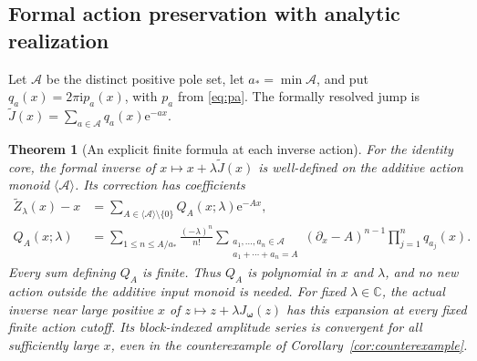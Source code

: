 \documentclass[11pt,a4paper]{article}
\numberwithin{equation}{section}
\newtheorem{theorem}{Theorem}[section]
\theoremstyle{definition}
\theoremstyle{remark}
\newcommand{\ii}{\mathrm i}
\newcommand{\e}{\mathrm e}
\newcommand{\C}{\mathbb C}
\newcommand{\bw}{\boldsymbol\omega}
\begin{document}
\subsection{Formal action preservation with analytic realization}
Let $\mathcal A$ be the distinct positive pole set, let
$a_*=\min\mathcal A$, and put $q_a(x)=2\pi\ii p_a(x)$, with $p_a$ from
\eqref{eq:pa}. The formally resolved jump is
$\widetilde J(x)=\sum_{a\in\mathcal A}q_a(x)\e^{-ax}$.

\begin{theorem}[An explicit finite formula at each inverse action]
\label{thm:formal-inverse}
For the identity core, the formal inverse of
$x\mapsto x+\lambda\widetilde J(x)$ is well-defined on the additive action
monoid $\langle\mathcal A\rangle$. Its correction has coefficients
\begin{align}
 \widetilde Z_\lambda(x)-x
   &=\sum_{A\in\langle\mathcal A\rangle\setminus\{0\}}
                   Q_A(x;\lambda)\e^{-Ax},\label{eq:formal-inverse}\\
 Q_A(x;\lambda)
   &=\sum_{1\le n\le A/a_*}\frac{(-\lambda)^n}{n!}
       \sum_{\substack{a_1,\ldots,a_n\in\mathcal A\\
                       a_1+\cdots+a_n=A}}
       (\partial_x-A)^{n-1}\prod_{j=1}^{n}q_{a_j}(x).
       \label{eq:action-coefficient}
\end{align}
Every sum defining $Q_A$ is finite. Thus $Q_A$ is polynomial in $x$ and
$\lambda$, and no new action outside the additive input monoid is needed.
For fixed $\lambda\in\C$, the actual inverse near large positive $x$ of
$z\mapsto z+\lambda J_{\bw}(z)$ has this expansion at every fixed finite
action cutoff. Its block-indexed amplitude series is convergent for all
sufficiently large $x$, even in the counterexample of
Corollary~\ref{cor:counterexample}.
\end{theorem}
\end{document}
